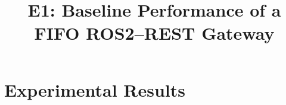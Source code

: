 \documentclass[10pt,a4paper,twocolumn]{article}
\title{E1: Baseline Performance of a FIFO ROS2--REST Gateway}
\author{}
\date{}
\begin{document}
\maketitle
\section{Experimental Results}

\clearpage
\appendix

\end{document}
